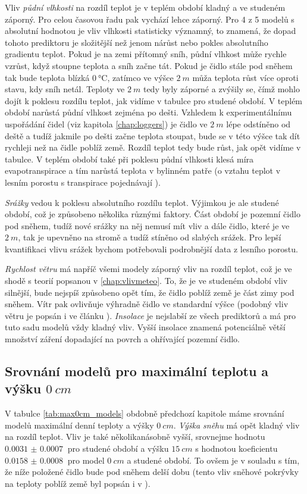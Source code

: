 Vliv \textit{půdní vlhkosti} na rozdíl teplot je v teplém období kladný a ve studeném záporný. Pro celou časovou řadu pak vychází lehce záporný. Pro 4 z 5 modelů s absolutní hodnotou je vliv vlhkosti statisticky významný, to znamená, že dopad tohoto prediktoru je složitější než jenom nárůst nebo pokles absolutního gradientu teplot. Pokud je na zemi přítomný sníh, půdní vlhkost může rychle vzrůst, když stoupne teplota a sníh začne tát. Pokud je čidlo stále pod sněhem tak bude teplota blízká $\SI{0}{\celsius}$, zatímco ve výšce $\SI{2}{m}$ můža teplota růst více oproti stavu, kdy sníh netál. Teploty ve $\SI{2}{m}$ tedy byly záporné a zvýšily se, čímž mohlo dojít k poklesu rozdílu teplot, jak vidíme v tabulce pro studené období. V teplém období narůstá půdní vlhkost zejména po dešti. Vzhledem k experimentálnímu uspořádání čidel (viz kapitola \ref{chap:loggers}) je čidlo ve $\SI{2}{m}$ lépe odstíněno od deště a tudíž jakmile po dešti začne teplota stoupat, bude se v této výšce tak dít rychleji než na čidle poblíž země. Rozdíl teplot tedy bude růst, jak opět vidíme v tabulce. V teplém období také při poklesu půdní vlhkosti klesá míra evapotranspirace a tím narůstá teplota v bylinném patře (o vztahu teplot v lesním porostu s transpirace pojednávají \cite{snow_deFrenneForestMicroclimates}).

\textit{Srážky} vedou k poklesu absolutního rozdílu teplot. Výjimkou je ale studené období, což je způsobeno několika různými faktory. Část období je pozemní čidlo pod sněhem, tudíž nové srážky na něj nemusí mít vliv a dále čidlo, které je ve $\SI{2}{m}$, tak je upevněno na stromě a tudíž stíněno od slabých srážek. Pro lepší kvantifikaci vlivu srážek bychom potřebovali podrobnější data z lesního porostu.

\textit{Rychlost větru} má napříč všemi modely záporný vliv na rozdíl teplot, což je ve shodě s teorií popsanou v \ref{chap:vlivmeteo}. To, že je ve studeném období vliv silnější, bude nejspíš způsobeno opět tím, že čidlo poblíž země je část zimy pod sněhem. Vítr pak ovlivňuje výhradně čidlo ve standardní výšce (podobný vliv větru je popsán i ve článku \cite{wind_contrastingmicroclimates}). \textit{Insolace} je nejslabší ze všech prediktorů a má pro tuto sadu modelů vždy kladný vliv. Vyšší insolace znamená potenciálně větší množství záření dopadající na povrch a ohřívající pozemní čidlo.

\subsection{Srovnání modelů pro maximální teplotu a výšku $\SI{0}{cm}$}
V tabulce \ref{tab:max0cm_models} obdobně předchozí kapitole máme srovnání modelů maximální denní teploty a výšky $\SI{0}{cm}$. \textit{Výška sněhu} má opět kladný vliv na rozdíl teplot. Vliv je také několikanásobně vyšší, srovnejme hodnotu $\SI{0.0031(7)}{}$ pro studené období a výšku $\SI{15}{cm}$ s hodnotou koeficientu $\SI{0.0158(8)}{}$ pro model $\SI{0}{cm}$ a studené období. To ovšem je v souladu s tím, že níže položené čidlo bude pod sněhem delší dobu (tento vliv sněhové pokrývky na teploty poblíž země byl popsán i v \cite{snow_deFrenneForestMicroclimates}).

